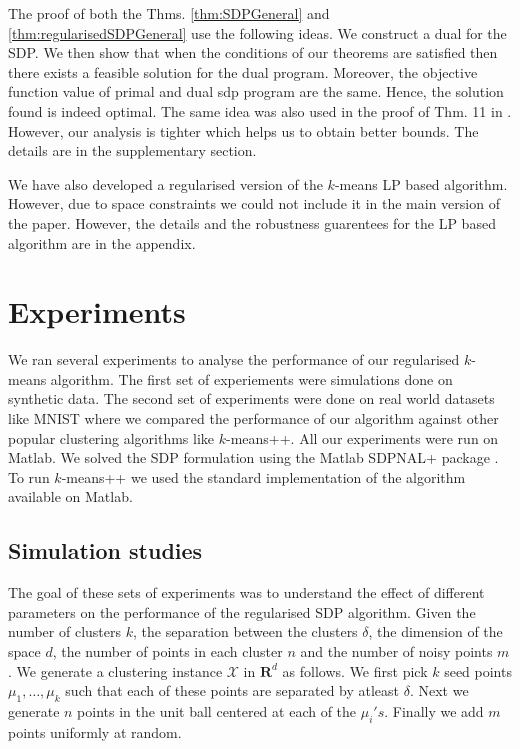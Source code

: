 \documentclass[12pt]{article}
\newcommand{\mc}{\mathcal}
\newcommand{\mb}{\mathbf}
\begin{document}
The proof of both the Thms. \ref{thm:SDPGeneral} and \ref{thm:regularisedSDPGeneral} use the following ideas. We construct a dual for the SDP. We then show that when the conditions of our theorems are satisfied then there exists a feasible solution for the dual program. Moreover, the objective function value of primal and dual sdp program are the same. Hence, the solution found is indeed optimal. The same idea was also used in the proof of Thm. 11 in \cite{awasthi2015relax}. However, our analysis is tighter which helps us to obtain better bounds. The details are in the supplementary section.

We have also developed a regularised version of the $k$-means LP based algorithm. However, due to space constraints we could not include it in the main version of the paper. However, the details and the robustness guarentees for the LP based algorithm are in the appendix. 

\section{Experiments}
We ran several experiments to analyse the performance of our regularised $k$-means algorithm. The first set of experiements were simulations done on synthetic data. The second set of experiments were done on real world datasets like MNIST where we compared the performance of our algorithm against other popular clustering algorithms like $k$-means++. All our experiments were run on Matlab. We solved the SDP formulation using the Matlab SDPNAL+ package \cite{yang2015sdpnal+}. To run $k$-means++ we used the standard implementation of the algorithm available on Matlab.

\subsection{Simulation studies}
The goal of these sets of experiments was to understand the effect of different parameters on the performance of the regularised SDP algorithm. Given the number of clusters $k$, the separation between the clusters $\delta$, the dimension of the space $d$, the number of points in each cluster $n$ and the number of noisy points $m$. We generate a clustering instance $\mc X$ in $\mb R^d$ as follows. We first pick $k$ seed points $\mu_1, \ldots, \mu_k$ such that each of these points are separated by atleast $\delta$. Next we generate $n$ points in the unit ball centered at each of the $\mu_i's$. Finally we add $m$ points uniformly at random. 
\end{document}
